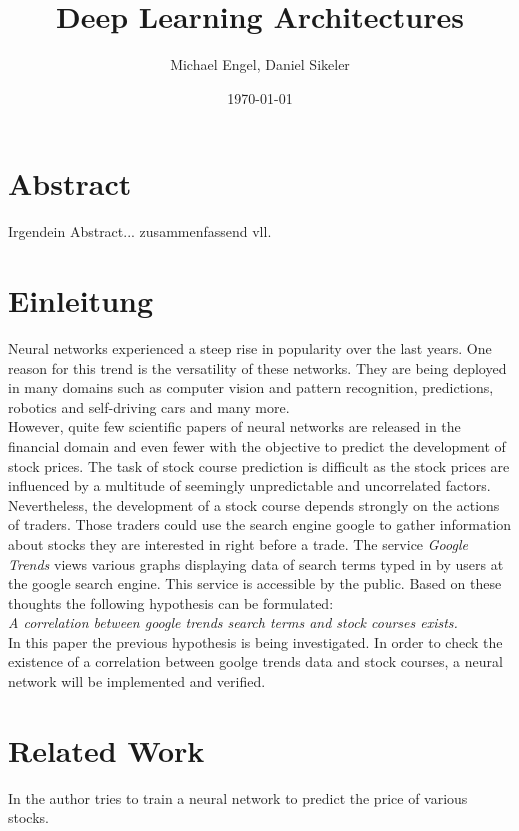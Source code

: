 \documentclass{IEEEtran}
\title{Deep Learning Architectures}
\author{Michael Engel, Daniel Sikeler}
\date{\today}
\begin{document}
\maketitle
\section{Abstract}
\label{sec:abstract}
Irgendein Abstract... zusammenfassend vll. 

\section{Einleitung}
\label{sec:einleitung}
Neural networks experienced a steep rise in popularity over the last years. One reason for this trend is the versatility of these networks. They are being deployed in many domains such as computer vision and pattern recognition, predictions, robotics and self-driving cars and many more. 
\\
However, quite few scientific papers of neural networks are released in the financial domain and even fewer with the objective to predict the development of stock prices. 
The task of stock course prediction is difficult as the stock prices are influenced by a multitude of seemingly unpredictable and uncorrelated factors. Nevertheless, the development of a stock course depends strongly on the actions of traders. Those traders could use the search engine google to gather information about stocks they are interested in right before a trade. The service \textit{Google Trends} views various graphs displaying data of search terms typed in by users at the google search engine. This service is accessible by the public. Based on these thoughts the following hypothesis can be formulated: \\
\textit{A correlation between google trends search terms and stock courses exists. } \\
In this paper the previous hypothesis is being investigated. In order to check the existence of a correlation between goolge trends data and stock courses, a neural network will be implemented and verified. 

\section{Related Work}
\label{sec:relatedwork}
In \cite{todo} the author tries to train a neural network to predict the price of various stocks. 
\end{document}
